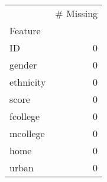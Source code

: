 \begin{tabu}{lr}
\toprule
 & # Missing \\
Feature &  \\
\midrule
ID & 0 \\
gender & 0 \\
ethnicity & 0 \\
score & 0 \\
fcollege & 0 \\
mcollege & 0 \\
home & 0 \\
urban & 0 \\
\bottomrule
\end{tabu}